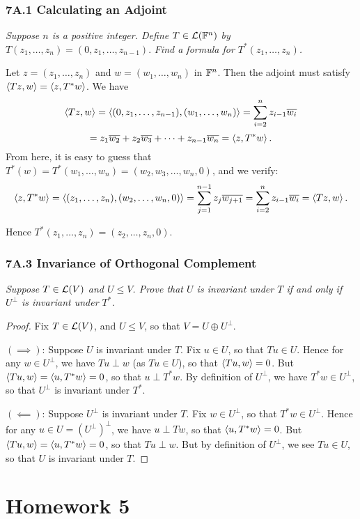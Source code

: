 \documentclass{article}
\begin{document}
\subsubsection*{7A.1 Calculating an Adjoint}
\textit{Suppose $n$ is a positive integer. Define $T\in\mathcal L(\mathbb F^n)$ by} $T(z_1, \ldots, z_n) = (0, z_1, \ldots, z_{n-1}).$ \textit{Find a formula for $T^*(z_1, \ldots, z_n)$.}
\begin{solution}
Let $z = (z_1, \ldots, z_n)$ and $w = (w_1,\ldots, w_n)$ in $\mathbb F^n$. Then the adjoint must satisfy $\left\langle Tz, w\right\rangle = \left\langle z, T^*w\right\rangle$. We have
$$\left\langle Tz, w\right\rangle = \left\langle(0, z_1, \ldots, z_{n-1}), (w_1, \ldots, w_n)\right\rangle = \sum_{i=2}^n z_{i-1}\overline{w_i}$$
$$=z_1\overline{w_2} + z_2\overline{w_3} + \cdots + z_{n-1}\overline{w_n}= \left\langle z, T^*w\right\rangle.$$
From here, it is easy to guess that $T^*(w) = T^*(w_1, \ldots, w_n) = ({w_2}, {w_3}, \ldots, {w_n}, 0)$, and we verify:
$$\left\langle z, T^*w\right\rangle = \left\langle(z_1, \ldots, z_n), (w_2, \ldots, w_n, 0)\right\rangle = \sum_{j=1}^{n-1} z_j\overline{w_{j+1}} = \sum_{i=2}^n z_{i-1}\overline{w_i} = \left\langle Tz, w\right\rangle.$$

Hence $T^*(z_1, \ldots, z_n) = \boxed{(z_2, \ldots, z_n, 0)}$.
\end{solution}
\subsubsection*{7A.3 Invariance of Orthogonal Complement}
\textit{Suppose $T\in\mathcal L(V)$ and $U\leq V$. Prove that $U$ is invariant under $T$ if and only if $U^\perp$ is invariant under $T^*$.}
\begin{proof} Fix $T\in\mathcal L(V)$, and $U\leq V$, so that $V = U\oplus U^\perp$.

$(\implies)$: Suppose $U$ is invariant under $T$. Fix $u\in U$, so that $Tu\in U$. Hence for any $w\in U^\perp$, we have $Tu \perp w$ (as $Tu\in U$), so that $\left\langle Tu, w\right\rangle = 0$. But $\left\langle Tu, w\right\rangle = \left\langle u, T^*w\right\rangle = 0$, so that $u\perp T^*w$. By definition of $U^\perp$, we have $T^*w\in U^\perp$, so that $U^\perp$ is invariant under $T^*$.

$(\impliedby)$: Suppose $U^\perp$ is invariant under $T$. Fix $w\in U^\perp$, so that $T^*w\in U^\perp$. Hence for any $u\in U = (U^{\perp})^{\perp}$, we have $u\perp Tw$, so that $\left\langle u, T^*w\right\rangle = 0$. But $\left\langle Tu, w\right\rangle = \left\langle u, T^*w\right\rangle = 0$, so that $Tu\perp w$. But by definition of $U^{\perp}$, we see $Tu\in U$, so that $U$ is invariant under $T$.
\end{proof}
\newpage
\section*{Homework 5}
\end{document}
